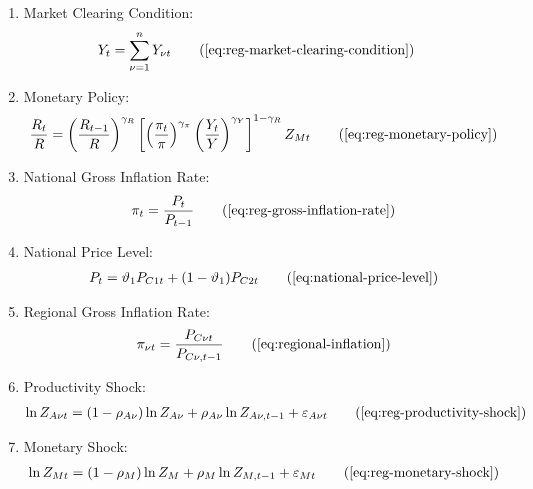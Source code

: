 \documentclass[
thesis.tex
]{subfiles}
\begin{document}
{\begin{itemize}
\begin{enumerate}
			\item Market Clearing Condition:
			\begin{align}
				Y_t &= \sum_{\nu=1}^{n} Y_{\nu t} \tag{\ref{eq:reg-market-clearing-condition}}
			\end{align}
			
			\item Monetary Policy:
			\begin{align}
				\frac{R_t}{R} = \left( 
				\frac{R_{t-1}}{R} \right)^{\gamma_R} \left[ \left(
				\frac{\pi_t}{\pi} \right)^{\gamma_\pi} \left( 
				\frac{Y_t}{Y} \right)^{\gamma_Y} \right]^{1-\gamma_R} Z_{Mt}
				\tag{\ref{eq:reg-monetary-policy}}
			\end{align}
			
			\item National Gross Inflation Rate:
			\begin{align}
				\pi_t = \frac{P_t}{P_{t-1}}
				\tag{\ref{eq:reg-gross-inflation-rate}}
			\end{align}
			
			\item National Price Level:
			\begin{align}
				P_t = \vartheta_1 P_{C1 t} + (1 -\vartheta_1) P_{C2 t}
				\tag{\ref{eq:national-price-level}}
			\end{align}
			
			\item Regional Gross Inflation Rate:
			\begin{align}
				\pi_{\nu t} = \frac{P_{C\nu t}}{P_{C\nu, t-1}} \tag{\ref{eq:regional-inflation}}
			\end{align}
			
			\item Productivity Shock:
			\begin{align}
				\ln{Z_{A\nu t}} = (1-\rho_{A\nu})\ln{Z_{A\nu}} + \rho_{A\nu}\ln{Z_{A\nu,t-1}} + \varepsilon_{A\nu t}
				\tag{\ref{eq:reg-productivity-shock}}
			\end{align}
			
			\item Monetary Shock:
			\begin{align}
				\ln{Z_{Mt}} = (1-\rho_M)\ln{Z_{M}} + \rho_M\ln{Z_{M,t-1}} + \varepsilon_{Mt}
				\tag{\ref{eq:reg-monetary-shock}}
			\end{align}
			
		\end{enumerate}
		
	\end{itemize}
	
} %
\end{document}

